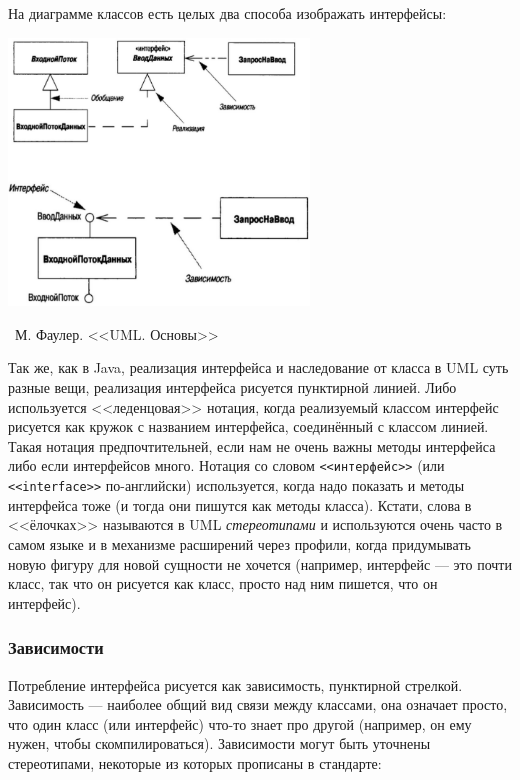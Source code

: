 \documentclass[a5paper]{article}
\newcommand{\attribution}[1] {
    \vspace{-5mm}\begin{flushright}\begin{scriptsize}%
    {\textcopyright\, #1}\end{scriptsize}\end{flushright}
}
\begin{document}
На диаграмме классов есть целых два способа изображать интерфейсы: 

\begin{center}
    \includegraphics[width=0.6\textwidth]{interfaces.png}
    \attribution{М. Фаулер. <<UML. Основы>>}
\end{center}

Так же, как в Java, реализация интерфейса и наследование от класса в UML суть разные вещи, реализация интерфейса рисуется пунктирной линией. Либо используется <<леденцовая>> нотация, когда реализуемый классом интерфейс рисуется как кружок с названием интерфейса, соединённый с классом линией. Такая нотация предпочтительней, если нам не очень важны методы интерфейса либо если интерфейсов много. Нотация со словом \verb|<<интерфейс>>| (или \verb|<<interface>>| по-английски) используется, когда надо показать и методы интерфейса тоже (и тогда они пишутся как методы класса). Кстати, слова в <<ёлочках>> называются в UML \textit{стереотипами} и используются очень часто в самом языке и в механизме расширений через профили, когда придумывать новую фигуру для новой сущности не хочется (например, интерфейс --- это почти класс, так что он рисуется как класс, просто над ним пишется, что он интерфейс).

\subsubsection{Зависимости}

Потребление интерфейса рисуется как зависимость, пунктирной стрелкой. Зависимость --- наиболее общий вид связи между классами, она означает просто, что один класс (или интерфейс) что-то знает про другой (например, он ему нужен, чтобы скомпилироваться). Зависимости могут быть уточнены стереотипами, некоторые из которых прописаны в стандарте:
\end{document}
